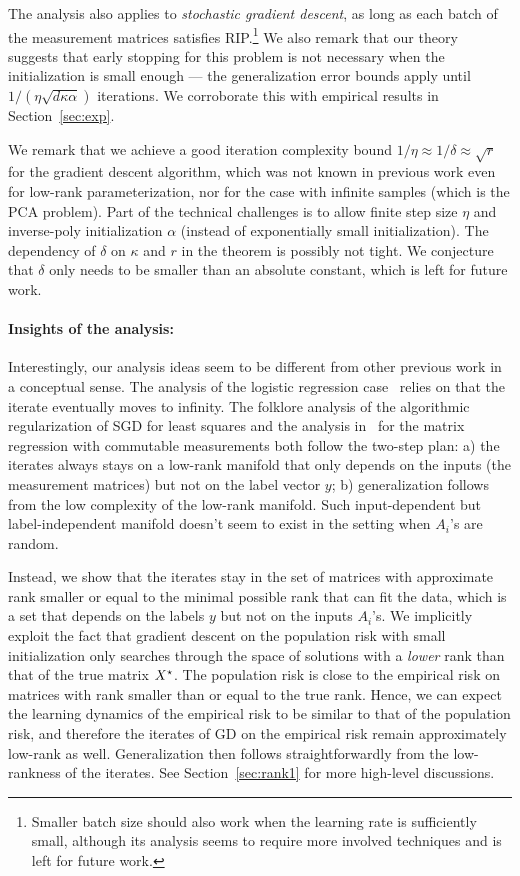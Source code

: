 The analysis also applies to \textit{stochastic gradient descent}, as long as each batch of the measurement matrices satisfies RIP.\footnote{Smaller batch size should also work when the learning rate is sufficiently small, although its analysis seems to require more involved techniques and is left for future work.} We also remark that our theory suggests that early stopping for this problem is not necessary when the initialization is small enough --- the generalization error bounds apply until $1/(\eta\sqrt{d\kappa \alpha})$ iterations. We corroborate this with empirical results in Section~\ref{sec:exp}. 

We remark that we achieve a good iteration complexity bound $1/\eta \approx 1/\delta\approx \sqrt{r}$ for the gradient descent algorithm, which was not known in previous work even for low-rank parameterization, nor for the case with infinite samples (which is the PCA problem).   Part of the technical challenges is to allow finite step size $\eta$ and inverse-poly initialization $\alpha$ (instead of exponentially small initialization). The dependency of $\delta$ on $\kappa$ and $r$ in the theorem is possibly not tight. We conjecture that $\delta$ only needs to be smaller than an absolute constant, which is left for future work. 

\paragraph{Insights of the analysis:} Interestingly, our analysis ideas seem to be different from other previous work in a conceptual sense. The analysis of the logistic regression case~\cite{soudry2017implicit} relies on that the iterate eventually moves to infinity. The folklore analysis of the algorithmic regularization of SGD for least squares and the analysis in~\cite{gunasekar2017implicit} for the matrix regression with commutable measurements both follow the two-step plan: a) the iterates always stays on a low-rank manifold that only depends on the inputs (the measurement matrices) but not on the label vector $y$; b) generalization follows from the low complexity of the low-rank manifold. Such input-dependent but label-independent manifold doesn't seem to exist in the setting when $A_i$'s are random. 

Instead, we show that the iterates stay in the set of matrices with approximate rank smaller or equal to the minimal possible rank that can fit the data, which is a set that depends on the labels $y$ but not on the inputs $A_i$'s.  
We implicitly exploit the fact that gradient descent on the population risk with small initialization only searches through the space of solutions with a \textit{lower} rank than that of the true matrix ${X}^\star$.  The population risk is close to the empirical risk on matrices with rank smaller than or equal to the true rank.  Hence, we can expect the learning dynamics of the empirical risk  to be similar to that of the population risk, and therefore the iterates of GD on the empirical risk remain approximately low-rank as well. Generalization then follows straightforwardly from the low-rankness of the iterates. See Section~\ref{sec:rank1} for more high-level discussions.

